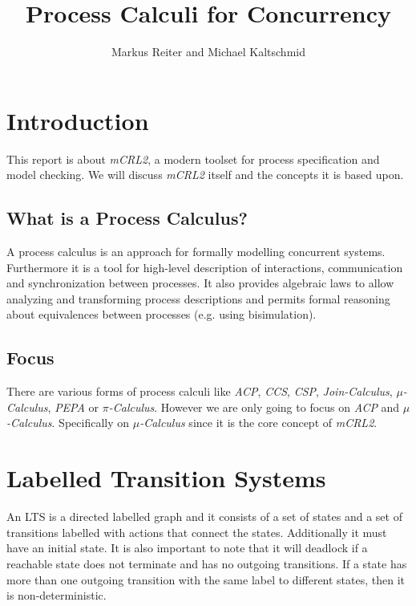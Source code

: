 \documentclass{clseminar}
\title{Process Calculi for Concurrency}
\author{Markus Reiter and Michael Kaltschmid}
\begin{document}
  \maketitle
  \newpage
  \tableofcontents

  \section{Introduction}
  This report is about \textit{mCRL2}, a modern toolset for process specification and model checking. We will discuss \textit{mCRL2} itself and the concepts it is based upon.

  \subsection{What is a Process Calculus?}

  A process calculus is an approach for formally modelling concurrent systems. Furthermore it is a tool for high-level description of interactions, communication and synchronization between processes. It also provides algebraic laws to allow analyzing and transforming process descriptions and permits formal reasoning about equivalences between processes (e.g. using bisimulation). \cite{process_calculus_wiki}

  \subsection{Focus}

  There are various forms of process calculi like \textit{ACP}, \textit{CCS}, \textit{CSP}, \textit{Join-Calculus}, \textit{$\mu$-Calculus}, \textit{PEPA} or \textit{$\pi$-Calculus}. However we are only going to focus on \textit{ACP} and \textit{$\mu$-Calculus}. Specifically on \textit{$\mu$-Calculus} since it is the core concept of \textit{mCRL2}.

  \section{Labelled Transition Systems}

  An LTS is a directed labelled graph and it consists of a set of states and a set of transitions labelled with actions that connect the states. Additionally it must have an initial state. It is also important to note that it will deadlock if a reachable state does not terminate and has no outgoing
  transitions. If a state has more than one outgoing transition with the same label to different states, then it is non-deterministic.
\end{document}
